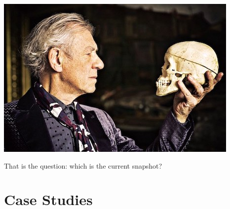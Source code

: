 \documentclass[aspectratio=169]{beamer}
\begin{document}
\begin{frame}
	\noindent\begin{minipage}{0.5\textwidth}
	\includegraphics[width=\linewidth]{pictures/to-be-or-not-to-be-that-is-the-question.jpg}
	\end{minipage}%
	\hfill%
	\begin{minipage}{0.45\textwidth}\raggedleft
	  \begin{block}{That is the  question:}
	  	which is the current snapshot?
	  \end{block}
	
	\end{minipage}
\end{frame}
  
  
\section{Case Studies}
\end{document}
